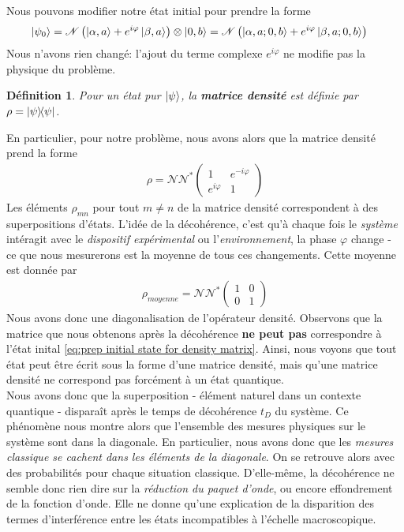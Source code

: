 \documentclass[11pt,oneside,a4paper]{article}
\newtheorem{definition}[theorem]{Définition}
\begin{document}
Nous pouvons modifier notre état initial pour prendre la forme
\begin{align}
  \ket{\psi_0} &= \mathcal{N}\left(\ket{\alpha,a}+e^{i\varphi}\ket{\beta,a}\right)\otimes\ket{0,b} = \mathcal{N}\left(\ket{\alpha,a;0,b}+e^{i\varphi}\ket{\beta,a;0,b}\right)\label{eq:prep initial state for density matrix}
\end{align}
Nous n'avons rien changé: l'ajout du terme complexe $e^{i\varphi}$ ne modifie pas la physique du problème.
\begin{definition}
  Pour un état pur $\ket{\psi}$, la \textbf{matrice densité} est définie par $\rho=\ketbra{\psi}$.
\end{definition}
En particulier, pour notre problème, nous avons alors que la matrice densité prend la forme
\begin{align*}
  \rho = \mathcal{N}\mathcal{N}^*\begin{pmatrix}
    1 & e^{-i\varphi}\\
    e^{i\varphi} & 1
  \end{pmatrix}
\end{align*}
Les éléments $\rho_{mn}$ pour tout $m\neq n$ de la matrice densité correspondent à des superpositions d'états. L'idée de la décohérence, c'est qu'à chaque fois le \emph{système} intéragit avec le \emph{dispositif expérimental} ou l'\emph{environnement}, la phase $\varphi$ change - ce que nous mesurerons est la moyenne de tous ces changements. Cette moyenne est donnée par
\begin{align}
  \rho_{moyenne} = \mathcal{N}\mathcal{N}^*\begin{pmatrix}
    1 & 0\\
    0 & 1
  \end{pmatrix}\label{eq:rho classique}
\end{align}
Nous avons donc une diagonalisation de l'opérateur densité. Observons que la matrice que nous obtenons après la décohérence \textbf{ne peut pas} correspondre à l'état inital \eqref{eq:prep initial state for density matrix}. Ainsi, nous voyons que tout état peut être écrit sous la forme d'une matrice densité, mais qu'une matrice densité ne correspond pas forcément à un état quantique.\\

Nous avons donc que la superposition - élément naturel dans un contexte quantique - disparaît après le temps de décohérence $t_D$ du système. Ce phénomène nous montre alors que l'ensemble des mesures physiques sur le système sont dans la diagonale. En particulier, nous avons donc que les \emph{mesures classique se cachent dans les éléments de la diagonale}. On se retrouve alors avec des probabilités pour chaque situation classique. D'elle-même, la décohérence ne semble donc rien dire sur la \emph{réduction du paquet d'onde}, ou encore effondrement de la fonction d'onde. Elle ne donne qu'une explication de la disparition des termes d'interférence entre les états incompatibles à l'échelle macroscopique.\\
\end{document}
